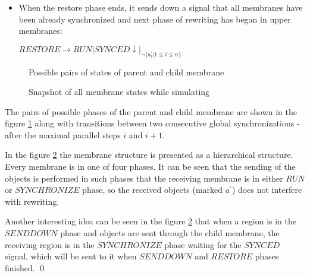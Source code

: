 \begin{dokaz}
\begin{itemize}
    \item When the restore phase ends, it sends down a signal that all membranes have been already synchronized and next phase of rewriting has began in upper membranes:

    $\mathit{RESTORE} \rightarrow \mathit{RUN}|\mathit{SYNCED}\downarrow|_{\neg \{a_i^{\prime}|1\leq i\leq n\}}$
  \end{itemize}

  \providecommand{\narrow}[1]{\scalebox{.85}[1.0]{#1}}

  \begin{figure}
    \def\svgwidth{\textwidth}
    
    \caption{Possible pairs of states of parent and child membrane}
    \label{fig:possible_pairs_of_states_of_parent_and_child_membrane}
  \end{figure}

  \begin{figure}
    \def\svgwidth{\textwidth}
    
    \caption{Snapshot of all membrane states while simulating}
    \label{fig:snapshot_of_all_membrane_states_while_simulating}
  \end{figure}

  The pairs of possible phases of the parent and child membrane are shown in the figure \ref{fig:possible_pairs_of_states_of_parent_and_child_membrane} along with transitions between two consecutive global synchronizations - after the maximal parallel steps $i$ and $i+1$.

  In the figure \ref{fig:snapshot_of_all_membrane_states_while_simulating} the membrane structure is presented as a hierarchical structure. Every membrane is in one of four phases. It can be seen that the sending of the objects is performed in such phases that the receiving membrane is in either $\mathit{RUN}$ or $\mathit{SYNCHRONIZE}$ phase, so the received objects (marked $a^\prime$) does not interfere with rewriting.

  Another interesting idea can be seen in the figure \ref{fig:snapshot_of_all_membrane_states_while_simulating} that when a region is in the $\mathit{SENDDOWN}$ phase and objects are sent through the child membrane, the receiving region is in the $\mathit{SYNCHRONIZE}$ phase waiting for the $\mathit{SYNCED}$ signal, which will be sent to it when $\mathit{SENDDOWN}$ and $\mathit{RESTORE}$ phases finished. \qed

\end{dokaz}

